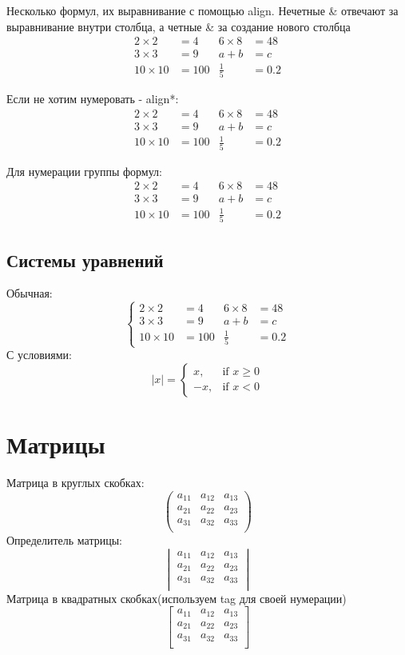 \documentclass[a4paper, 12pt]{article}
\begin{document}
Несколько формул, их выравнивание с помощью align. Нечетные \& отвечают за выравнивание внутри столбца, а четные \& за создание нового столбца
\begin{align}
2\times 2 &= 4& 6\times 8 &= 48\\
3\times 3 &= 9& a + b &= c\\
10\times 10 &= 100& \frac{1}{5} &= 0.2
\end{align}

Если не хотим нумеровать - align*:
\begin{align*}
2\times 2 &= 4& 6\times 8 &= 48\\
3\times 3 &= 9& a + b &= c\\
10\times 10 &= 100& \frac{1}{5} &= 0.2
\end{align*}

Для нумерации группы формул:
\begin{equation}
\begin{aligned}
2\times 2 &= 4& 6\times 8 &= 48\\
3\times 3 &= 9& a + b &= c\\
10\times 10 &= 100& \frac{1}{5} &= 0.2
\end{aligned}
\end{equation}


\subsection{Системы уравнений}
Обычная:
\[\left\{
\begin{aligned}
2\times 2 &= 4& 6\times 8 &= 48\\
3\times 3 &= 9& a + b &= c\\
10\times 10 &= 100& \frac{1}{5} &= 0.2
\end{aligned}\right.
\]
С условиями:
\[
|x| = \begin{cases}
x, &\text{if } x \ge 0 \\
-x, &\text{if } x < 0
\end{cases}
\]

\section{Матрицы}
Матрица в круглых скобках:
\[
\begin{pmatrix}
a_{11} & a_{12} & a_{13}\\
a_{21} & a_{22} & a_{23}\\
a_{31} & a_{32} & a_{33}\\
\end{pmatrix}
\]
Определитель матрицы:
\[
\begin{vmatrix}
a_{11} & a_{12} & a_{13}\\
a_{21} & a_{22} & a_{23}\\
a_{31} & a_{32} & a_{33}\\
\end{vmatrix}
\]
Матрица в квадратных скобках(используем tag для своей нумерации)
\[
\begin{bmatrix}
a_{11} & a_{12} & a_{13}\\
a_{21} & a_{22} & a_{23}\\
a_{31} & a_{32} & a_{33}\\
\end{bmatrix}\tag{MATRIX}
\]
\end{document}
